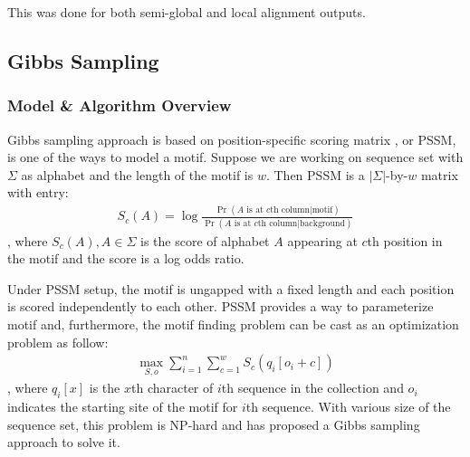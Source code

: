 \documentclass[11pt, oneside]{article}
\begin{document}
This was done for both semi-global and local alignment outputs. 

\subsection{Gibbs Sampling}

\subsubsection{Model \& Algorithm Overview}

Gibbs sampling approach is based on position-specific scoring matrix \cite{stormo1982use}, or PSSM, is one of the ways to model a motif. Suppose we are working on sequence set with $\Sigma$ as alphabet and the length of the motif is $w$. Then PSSM is a $|\Sigma|$-by-$w$ matrix with entry:
\begin{align*}
  S_c(A) = \log \frac{\Pr(\text{$A$ is at $c$th column}|\text{motif})}{\Pr(\text{$A$ is at $c$th column}|\text{background})}
\end{align*}
, where $S_c(A), A \in \Sigma$ is the score of alphabet $A$ appearing at $c$th position in the motif and the score is a log odds ratio.

Under PSSM setup, the motif is ungapped with a fixed length and each position is scored independently to each other. PSSM provides a way to parameterize motif and, furthermore, the motif finding problem can be cast as an optimization problem as follow:
\begin{align}
  \max_{S, o} \sum_{i = 1}^n \sum_{c = 1}^w S_c(q_i[o_i + c]) \label{eq:obj}
\end{align}
, where $q_i[x]$ is the $x$th character of $i$th sequence in the collection and $o_i$ indicates the starting site of the motif for $i$th sequence. With various size of the sequence set, this problem is NP-hard and \cite{lawrence1993detecting} has proposed a Gibbs sampling approach to solve it. 
\end{document}
